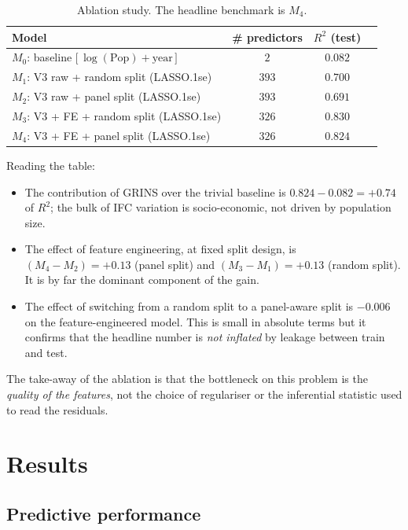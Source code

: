 \documentclass[11pt,a4paper]{article}
\begin{document}
\begin{table}[h!]
  \centering
  \begin{tabular}{lccc}
    \toprule
    Model & \# predictors & \(R^{2}\) (test) \\
    \midrule
    \(M_{0}\): baseline \(\bigl[\,\log(\mathrm{Pop}) + \text{year}\,\bigr]\) & \(2\)   & \(0.082\) \\
    \(M_{1}\): V3 raw + random split (LASSO.1se) & \(393\) & \(0.700\) \\
    \(M_{2}\): V3 raw + panel split  (LASSO.1se) & \(393\) & \(0.691\) \\
    \(M_{3}\): V3 + FE + random split (LASSO.1se) & \(326\) & \(0.830\) \\
    \(M_{4}\): V3 + FE + panel split  (LASSO.1se) & \(326\) & \(0.824\) \\
    \bottomrule
  \end{tabular}
  \caption{Ablation study. The headline benchmark is \(M_{4}\).}
  \label{tab:ablation}
\end{table}

Reading the table:
\begin{itemize}[leftmargin=2em]
  \item The contribution of GRINS over the trivial baseline is
    \(0.824 - 0.082 = +0.74\) of \(R^{2}\); the bulk of IFC variation
    is socio-economic, not driven by population size.
  \item The effect of feature engineering, at fixed split design, is
    \((M_{4} - M_{2}) = +0.13\) (panel split) and
    \((M_{3} - M_{1}) = +0.13\) (random split). It is by far the
    dominant component of the gain.
  \item The effect of switching from a random split to a panel-aware
    split is \(-0.006\) on the feature-engineered model. This is
    small in absolute terms but it confirms that the headline number
    is \emph{not inflated} by leakage between train and test.
\end{itemize}

The take-away of the ablation is that the bottleneck on this problem
is the \emph{quality of the features}, not the choice of regulariser
or the inferential statistic used to read the residuals.

\section{Results}
\label{sec:results}

\subsection{Predictive performance}
\end{document}
